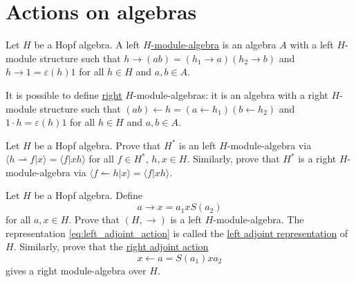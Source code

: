 
\section{Actions on algebras}

\begin{definition}
\label{def:module_algebra}
Let $H$ be a Hopf algebra. A left \underline{$H$-module-algebra} is an algebra
$A$ with a left $H$-module structure such that
$h\rightarrow(ab)=(h_{1}\rightarrow a)(h_{2}\rightarrow b)$ and
$h\rightarrow1=\varepsilon(h)1$ for all $h\in H$ and $a,b\in A$. 
\end{definition}

\begin{remark}
It is possible to define \underline{right} $H$-module-algebras: it is an
algebra with a right $H$-module structure such that $(ab)\leftarrow
h=(a\leftarrow h_{1})(b\leftarrow h_{2})$ and $1\cdot h=\varepsilon(h)1$ for
all $h\in H$ and $a,b\in A$. 
\end{remark}

\begin{exercise}
Let $H$ be a Hopf algebra.  Prove that $H^*$ is an left $H$-module-algebra
via  $\langle h\rightharpoonup f|x\rangle=\langle f|xh\rangle$ for all $f\in
H^*$, $h,x\in H$.  Similarly, prove that $H^*$ is a right $H$-module-algebra
via $\langle f\leftharpoonup h|x\rangle=\langle f|xh\rangle$.
\end{exercise}

\begin{exercise}
\label{exercise:adjoint}
Let $H$ be a Hopf algebra. Define 
\begin{equation}
a\rightarrow x=a_{1}xS(a_{2})\label{eq:left_adjoint_action}
\end{equation}
for all $a,x\in H$. Prove that $(H,\rightarrow)$ is a left $H$-module-algebra.
The representation \ref{eq:left_adjoint_action} is called the \underline{left
adjoint representation} of $H$. Similarly, prove that the \underline{right
adjoint action}
\begin{equation}
x\leftarrow a=S(a_{1})xa_{2}\label{eq:right_adjoint_action}
\end{equation}
gives a right module-algebra over $H$.
\end{exercise}

